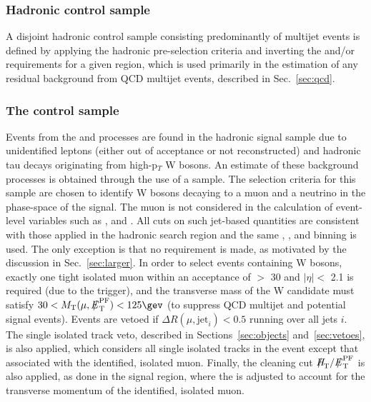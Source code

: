 \subsubsection{Hadronic control sample}

A disjoint hadronic control sample consisting predominantly of
multijet events is defined by applying the hadronic pre-selection
criteria and inverting the \alphat and/or \mhtmet requirements for a
given \scalht region, which is used primarily in the estimation of any
residual background from QCD multijet events, described in
Sec.~\ref{sec:qcd}.

\subsubsection{The \texorpdfstring{\mj}{muon plus jets} control sample}
\label{subsec:mucontrolSelection}

Events from the \wj and \ttbar processes are found in the hadronic
signal sample due to unidentified leptons (either out of acceptance or
not reconstructed) and hadronic tau decays originating from
high-p$_{T}$ W bosons. An estimate of these background processes is
obtained through the use of a \mj sample. The selection criteria for
this sample are chosen to identify W bosons decaying to a muon and a
neutrino in the phase-space of the signal. The muon is not considered
in the calculation of event-level variables such as \scalht, \mht and
\alphat. All cuts on such jet-based quantities are consistent with
those applied in the hadronic search region and the same \njet, \nb,
and \scalht binning is used. The only exception is that no \alphat
requirement is made, as motivated by the discussion in
Sec.~\ref{sec:larger}. In order to select events containing W bosons,
exactly one tight isolated muon within an acceptance of \PT $>$ 30
\gev and $|\eta| <$ 2.1 is required (due to the trigger), and the
transverse mass of the W candidate must satisfy $30 < \mt(\mu,\pfmet)
< 125\gev$ (to suppress QCD multijet and potential signal
events). Events are vetoed if $\Delta R(\mu,\textrm{jet}_i) < 0.5$
running over all jets $i$. The single isolated track veto, described
in Sections~\ref{sec:objects} and~\ref{sec:vetoes}, is also
applied, which considers all single isolated tracks in the event
except that associated with the identified, isolated muon. Finally,
the cleaning cut $\mht/\pfmet$ is also applied, as done in the signal
region, where the \pfmet is adjusted to account for the transverse
momentum of the identified, isolated muon.

